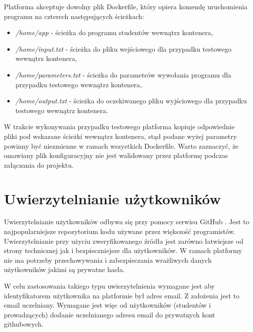 Platforma akceptuje dowolny plik Dockerfile, który opiera komendę uruchomienia programu na czterech następujących ścieżkach:
\begin{itemize}
    \item \textit{/home/app} - ścieżka do programu studentów wewnątrz kontenera,
    \item \textit{/home/input.txt} - ścieżka do pliku wejściowego dla przypadku testowego wewnątrz kontenera,
    \item \textit{/home/parameters.txt} - ścieżka do parametrów wywołania programu dla przypadku testowego wewnątrz kontenera,
    \item \textit{/home/output.txt} - ścieżka do oczekiwanego pliku wyjściowego dla przypadku testowego wewnątrz kontenera.
\end{itemize}

W trakcie wykonywania przypadku testowego platforma kopiuje odpowiednie pliki pod wskazane ścieżki wewnątrz kontenera, stąd podane wyżej parametry powinny być niezmienne w ramach wszystkich Dockerfile.
Warto zaznaczyć, że omawiany plik konfiguracyjny nie jest walidowany przez platformę podczas załączania do projektu.


\section {Uwierzytelnianie użytkowników}
\label{authorization}

Uwierzytelnianie użytkowników odbywa się przy pomocy serwisu GitHub \cite{gitHub}.
Jest to najpopularniejsze repozytorium kodu używane przez większość programistów.
Uwierzytelnianie przy użyciu zweryfikowanego źródła jest zarówno łatwiejsze od strony technicznej jak i bezpieczniejsze dla użytkowników.
W ramach platformy nie ma potrzeby przechowywania i zabezpieczania wrażliwych danych użytkowników jakimi są prywatne hasła.

W celu zastosowania takiego typu uwierzytelnienia wymagane jest aby identyfikatorem użytkownika na platformie był adres email.
Z założenia jest to email uczelniany.
Wymagane jest więc od użytkowników (studentów i prowadzących) dodanie uczelnianego adresu email do prywatnych kont githubowych.

